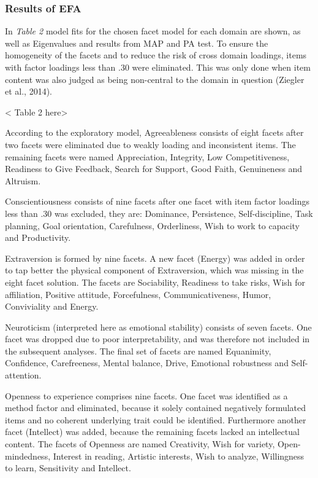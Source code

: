\documentclass[,man]{apa6}
\theoremstyle{definition}
\theoremstyle{definition}
\theoremstyle{definition}
\theoremstyle{remark}
\begin{document}
\hypertarget{results-of-efa}{%
\subsubsection{Results of EFA}\label{results-of-efa}}

In \emph{Table 2} model fits for the chosen facet model for each domain
are shown, as well as Eigenvalues and results from MAP and PA test. To
ensure the homogeneity of the facets and to reduce the risk of cross
domain loadings, items with factor loadings less than .30 were
eliminated. This was only done when item content was also judged as
being non-central to the domain in question (Ziegler et al., 2014).

\vspace{5mm}

\textless{} Table 2 here\textgreater{}

\vspace{5mm}

According to the exploratory model, Agreeableness consists of eight
facets after two facets were eliminated due to weakly loading and
inconsistent items. The remaining facets were named Appreciation,
Integrity, Low Competitiveness, Readiness to Give Feedback, Search for
Support, Good Faith, Genuineness and Altruism.

Conscientiousness consists of nine facets after one facet with item
factor loadings less than .30 was excluded, they are: Dominance,
Persistence, Self-discipline, Task planning, Goal orientation,
Carefulness, Orderliness, Wish to work to capacity and Productivity.

Extraversion is formed by nine facets. A new facet (Energy) was added in
order to tap better the physical component of Extraversion, which was
missing in the eight facet solution. The facets are Sociability,
Readiness to take risks, Wish for affiliation, Positive attitude,
Forcefulness, Communicativeness, Humor, Conviviality and Energy.

Neuroticism (interpreted here as emotional stability) consists of seven
facets. One facet was dropped due to poor interpretability, and was
therefore not included in the subsequent analyses. The final set of
facets are named Equanimity, Confidence, Carefreeness, Mental balance,
Drive, Emotional robustness and Self-attention.

Openness to experience comprises nine facets. One facet was identified
as a method factor and eliminated, because it solely contained
negatively formulated items and no coherent underlying trait could be
identified. Furthermore another facet (Intellect) was added, because the
remaining facets lacked an intellectual content. The facets of Openness
are named Creativity, Wish for variety, Open-mindedness, Interest in
reading, Artistic interests, Wish to analyze, Willingness to learn,
Sensitivity and Intellect.
\end{document}
